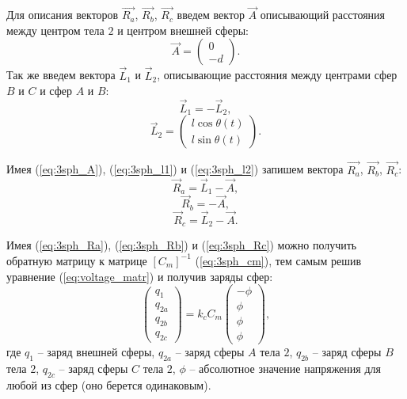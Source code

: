 Для описания векторов $\vec{R_a}$, $\vec{R_b}$, $\vec{R_c}$ введем вектор $\vec{A}$  описывающий расстояния между центром тела $2$ и центром внешней сферы:
\begin{equation}
\label{eq:3sph_A}
	\vec{A} =
	\begin{pmatrix}
		0\\
		-d
	\end{pmatrix}.
\end{equation}
Так же введем вектора $\vec{L}_1$ и $\vec{L}_2$, описывающие расстояния между центрами сфер $B$ и $C$ и сфер $A$ и $B$:
\begin{equation}
\label{eq:3sph_l1}
	\vec{L}_1 = -\vec{L}_2,
\end{equation}
\begin{equation}
\label{eq:3sph_l2}
	\vec{L}_2 = 
	\begin{pmatrix}
		l \cos \theta(t)\\
		l \sin \theta(t)
	\end{pmatrix}.
\end{equation}

Имея (\ref{eq:3sph_A}), (\ref{eq:3sph_l1}) и (\ref{eq:3sph_l2}) запишем вектора $\vec{R_a}$, $\vec{R_b}$, $\vec{R_c}$:
\begin{equation}
\label{eq:3sph_Ra}
	\vec{R}_a = \vec{L}_1 - \vec{A},
\end{equation}
\begin{equation}
\label{eq:3sph_Rb}
	\vec{R}_b = -\vec{A},
\end{equation}
\begin{equation}
\label{eq:3sph_Rc}
	\vec{R}_c = \vec{L}_2 - \vec{A}.
\end{equation}

Имея (\ref{eq:3sph_Ra}), (\ref{eq:3sph_Rb}) и (\ref{eq:3sph_Rc}) можно получить обратную матрицу к матрице $[C_m]^{-1}$ (\ref{eq:3sph_cm}), тем самым решив уравнение (\ref{eq:voltage_matr}) и получив заряды сфер:
\begin{equation}
\label{eq:3sph_q_eq}
	\begin{pmatrix}
		q_1\\
		q_{2a}\\
		q_{2b}\\
		q_{2c}
	\end{pmatrix}
	= k_c C_m 
	\begin{pmatrix}
		-\phi\\
		\phi\\
		\phi\\
		\phi
	\end{pmatrix},
\end{equation}
где $q_1$ – заряд внешней сферы, $q_{2a}$ – заряд сферы $A$ тела $2$, $q_{2b}$ – заряд сферы $B$ тела $2$, $q_{2c}$ – заряд сферы $C$ тела $2$, $\phi$ – абсолютное значение напряжения для любой из сфер (оно берется одинаковым). 

